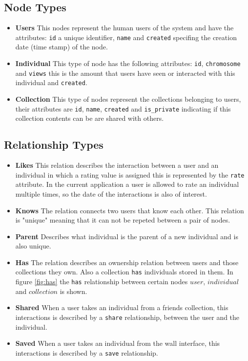 \documentclass[conference]{IEEEtran}
\begin{document}
\subsection{Node Types}
\begin{itemize}

\item {\bf Users} This nodes represent the human users of the system and have 
the attributes: {\tt id} a unique identifier, {\tt name}  and {\tt created}
specifing the  creation date (time stamp) of the node. 

\item {\bf Individual} This type of node has the following attributes: 
{\tt id}, {\tt chromosome}  and {\tt views} this is 
the amount that users have seen or interacted with this individual and
 {\tt created}.

\item {\bf Collection} This type of nodes represent the collections belonging
to users, their attributes are {\tt id}, 
{\tt name}, {\tt created} and {\tt is\_private} indicating if this collection
contents can be are shared with others. 
\end{itemize}

\subsection{Relationship Types}
\begin{itemize}
\item {\bf Likes} This relation describes the interaction between a user and
an individual in which a rating value is assigned this is represented by 
the {\tt rate} attribute. In the current application a user is allowed to rate
an individual multiple times, so the date of the interactions is also of
interest. 

\item {\bf Knows} The relation connects two users that know each
other. This relation is "unique" meaning that it can not be repeted between a pair of nodes. 

\item {\bf Parent} Describes what individual is the parent of a new individual and is also unique.

\item {\bf Has} The relation describes an ownership relation between users and
those collections they own. Also a collection {\tt has}  individuals stored
in them.  In figure \ref{fig:has} the {\tt has} relationship 
between certain nodes $user$, $individual$ and $collection$ is shown.

\item {\bf Shared} When a user takes an individual from a friends collection, this interactions is described by a {\tt share} relationship, between the user and the individual. 

\item {\bf Saved} When a user takes an individual from the wall interface, this 
interactions is described by a {\tt save} relationship. 
\end{itemize}
\end{document}
